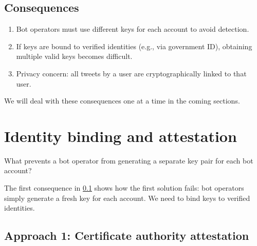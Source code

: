 \subsection{Consequences}\label{BotConsequencesFirst}

\begin{enumerate}
  \item Bot operators must use different keys for each account to avoid
    detection.
  \item If keys are bound to verified identities (e.g., via government
    ID), obtaining multiple valid keys becomes difficult.
  \item Privacy concern: all tweets by a user are cryptographically
    linked to that user.
\end{enumerate}

We will deal with these consequences one at a time in the coming
sections.


\section{Identity binding and attestation}\label{BotIdentityBinding}


\begin{exercise}
  What prevents a bot operator from generating a separate key pair for
  each bot account?
\end{exercise}

The first consequence in \cref{BotConsequencesFirst} shows how the first
solution fails: bot operators simply generate a fresh key for each
account.
We need to bind keys to verified identities.

\subsection{Approach 1: Certificate authority attestation}

